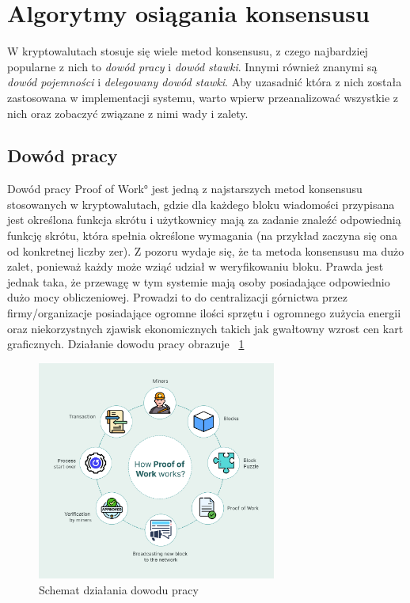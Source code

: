 \section{Algorytmy osiągania konsensusu}
\label{sec:Konsensus}
W kryptowalutach stosuje się wiele metod konsensusu, z czego najbardziej popularne z nich to \textit{dowód pracy} i \textit{dowód stawki}. Innymi również znanymi są \textit{dowód pojemności} i \textit{delegowany dowód stawki}. Aby uzasadnić która z nich została zastosowana w implementacji systemu, warto wpierw przeanalizować wszystkie z nich oraz zobaczyć związane z nimi wady i zalety.
\subsection{Dowód pracy}
\label{ssec:PoW}
Dowód pracy \ang{Proof of Work} jest jedną z najstarszych metod konsensusu stosowanych w kryptowalutach, gdzie dla każdego bloku wiadomości przypisana jest określona funkcja skrótu i użytkownicy mają za zadanie znaleźć odpowiednią funkcję skrótu, która spełnia określone wymagania (na przykład zaczyna się ona od konkretnej liczby zer). Z pozoru wydaje się, że ta metoda konsensusu ma dużo zalet, ponieważ każdy może wziąć udział w weryfikowaniu bloku. Prawda jest jednak taka, że przewagę w tym systemie mają osoby posiadające odpowiednio dużo mocy obliczeniowej. Prowadzi to do centralizacji górnictwa przez firmy/organizacje posiadające ogromne ilości sprzętu i ogromnego zużycia energii oraz niekorzystnych zjawisk ekonomicznych takich jak gwałtowny wzrost cen kart graficznych.
Działanie dowodu pracy obrazuje \figurename{~\ref{fig:ConsesnsusProofOfWork}}
\begin{figure}[H]
    \centering
    \includegraphics[width=0.7\textwidth]{Images/ConsesnsusProofOfWork.png}
    \caption{Schemat działania dowodu pracy}
    \label{fig:ConsesnsusProofOfWork}
\end{figure}
